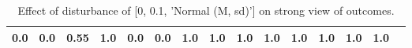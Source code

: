 \begin{table}
\begin{tabular}{l|cc|cc|cc|cc|cc|cc|cc}
\cellcolor{Bittersweet}0.0&\cellcolor{Bittersweet}0.0&0.55&1.0&\cellcolor{Bittersweet}0.0&\cellcolor{Bittersweet}0.0&\cellcolor{Bittersweet}1.0&\cellcolor{Bittersweet}1.0&\cellcolor{Bittersweet}1.0&\cellcolor{Bittersweet}1.0&\cellcolor{Bittersweet}1.0&\cellcolor{Bittersweet}1.0&\cellcolor{Bittersweet}1.0&\cellcolor{Bittersweet}1.0\\\bottomrule\end{tabular}\caption{Effect of disturbance of [0, 0.1, 'Normal (M, sd)'] on strong view of outcomes.}\end{table}